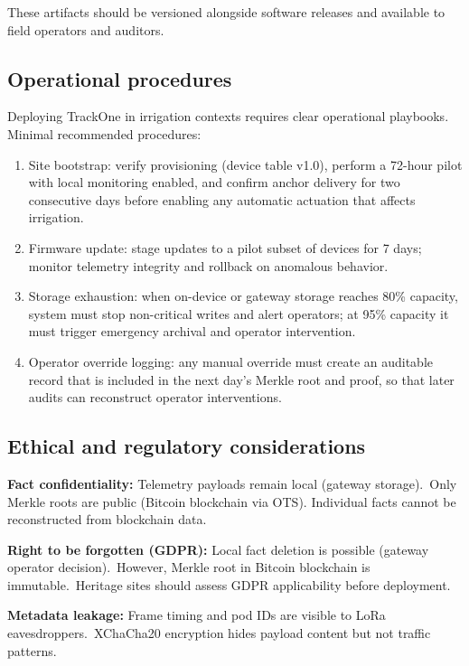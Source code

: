 These artifacts should be versioned alongside software releases and available to field operators and auditors.

\subsection{Operational procedures}
Deploying TrackOne in irrigation contexts requires clear operational playbooks. Minimal recommended procedures:
\begin{enumerate}[nosep]
  \item Site bootstrap: verify provisioning (device table v1.0), perform a 72-hour pilot with local monitoring enabled, and confirm anchor delivery for two consecutive days before enabling any automatic actuation that affects irrigation.
  \item Firmware update: stage updates to a pilot subset of devices for 7 days; monitor telemetry integrity and rollback on anomalous behavior.
  \item Storage exhaustion: when on-device or gateway storage reaches 80\% capacity, system must stop non-critical writes and alert operators; at 95\% capacity it must trigger emergency archival and operator intervention.
  \item Operator override logging: any manual override must create an auditable record that is included in the next day's Merkle root and proof, so that later audits can reconstruct operator interventions.
\end{enumerate}

\subsection{Ethical and regulatory considerations}

\textbf{Fact confidentiality:} Telemetry payloads remain local (gateway storage).\ Only Merkle roots are public (Bitcoin blockchain via OTS). Individual facts cannot be reconstructed from blockchain data.

\textbf{Right to be forgotten (GDPR):} Local fact deletion is possible (gateway operator decision).\ However, Merkle root in Bitcoin blockchain is immutable.\ Heritage sites should assess GDPR applicability before deployment.

\textbf{Metadata leakage:} Frame timing and pod IDs are visible to LoRa eavesdroppers.\ XChaCha20 encryption hides payload content but not traffic patterns.


